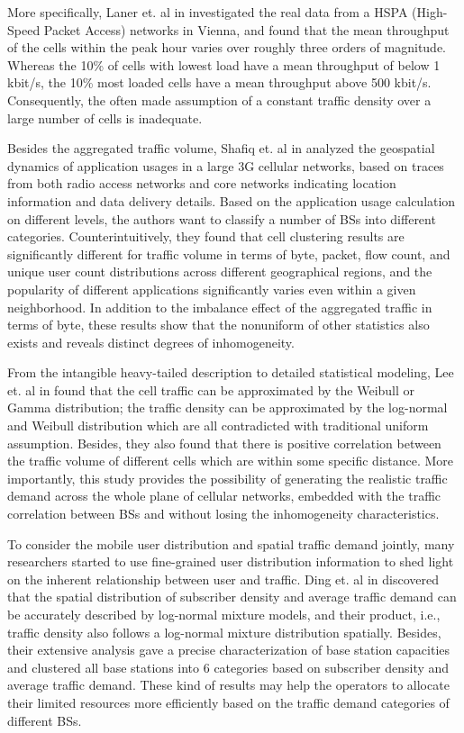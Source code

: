 More specifically, Laner et. al in \cite{laner2012users} investigated the real data from a HSPA (High-Speed Packet Access) networks in Vienna, and found that the mean throughput of the cells within the peak hour varies over roughly three orders of magnitude. Whereas the 10\% of cells with lowest load have a mean throughput of below 1 kbit/s, the 10\% most loaded cells have a mean throughput above 500 kbit/s. Consequently, the often made assumption of a constant traffic density over a large number of cells is inadequate.

Besides the aggregated traffic volume, Shafiq et. al in \cite{shafiq2012characterizing} analyzed the geospatial dynamics of application usages in a large 3G cellular networks, based on traces from both radio access networks and core networks indicating location information and data delivery details. Based on the application usage calculation on different levels, the authors want to classify a number of BSs into different categories. Counterintuitively, they found that cell clustering results are significantly different for traffic volume in terms of byte, packet, flow count, and unique user count distributions across different geographical regions, and the popularity of different applications significantly varies even within a given neighborhood. In addition to the imbalance effect of the aggregated traffic in terms of byte, these results show that the nonuniform of other statistics also exists and reveals distinct degrees of inhomogeneity.

From the intangible heavy-tailed description to detailed statistical modeling, Lee et. al in \cite{lee2014spatial} found that the cell traffic can be approximated by the Weibull or Gamma distribution; the traffic density can be approximated by the log-normal and Weibull distribution which are all contradicted with traditional uniform assumption. Besides, they also found that there is positive correlation between the traffic volume of different cells which are within some specific distance. More importantly, this study provides the possibility of generating the realistic traffic demand across the whole plane of cellular networks, embedded with the traffic correlation between BSs and without losing the inhomogeneity characteristics.

To consider the mobile user distribution and spatial traffic demand jointly, many researchers started to use fine-grained user distribution information to shed light on the inherent relationship between user and traffic. Ding et. al in \cite{ding2016measurement} discovered that the spatial distribution of subscriber density and average traffic demand can be accurately described by log-normal mixture models, and their product, i.e., traffic density also follows a log-normal mixture distribution spatially. Besides, their extensive analysis gave a precise characterization of base station capacities and clustered all base stations into 6 categories based on subscriber density and average traffic demand. These kind of results may help the operators to allocate their limited resources more efficiently based on the traffic demand categories of different BSs.

